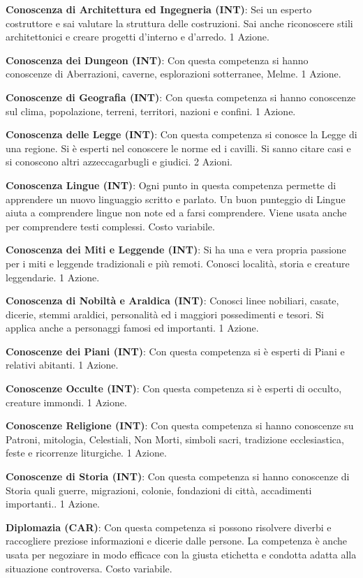 \begin{multicols}{2}
\textbf{Conoscenza di Architettura ed Ingegneria (INT)}: Sei un esperto costruttore e sai valutare la struttura delle costruzioni. Sai anche riconoscere stili architettonici e creare progetti d'interno e d'arredo. 1 Azione.

\textbf{Conoscenza dei Dungeon (INT)}: Con questa competenza si hanno conoscenze di Aberrazioni, caverne, esplorazioni sotterranee, Melme. 1 Azione.

\textbf{Conoscenze di Geografia (INT)}: Con questa competenza si hanno conoscenze sul clima, popolazione, terreni, territori, nazioni e confini. 1 Azione.

\textbf{Conoscenza delle Legge (INT)}: Con questa competenza si conosce la Legge di una regione. Si è esperti nel conoscere le norme ed i cavilli. Si sanno citare casi e si conoscono altri azzeccagarbugli e giudici. 2 Azioni.

\textbf{Conoscenza Lingue (INT)}: Ogni punto in questa competenza permette di apprendere un nuovo linguaggio scritto e parlato. Un buon punteggio di Lingue aiuta a comprendere lingue non note ed a farsi comprendere. Viene usata anche per comprendere testi complessi. Costo variabile.

\textbf{Conoscenza dei Miti e Leggende (INT)}: Si ha una e vera propria passione per i miti e leggende tradizionali e più remoti. Conosci località, storia e creature leggendarie. 1 Azione.

\textbf{Conoscenza di Nobiltà e Araldica (INT)}: Conosci linee nobiliari, casate, dicerie, stemmi araldici, personalità ed i maggiori possedimenti e tesori. Si applica anche a personaggi famosi ed importanti. 1 Azione.

\textbf{Conoscenze dei Piani (INT)}: Con questa competenza si è esperti di Piani e relativi abitanti. 1 Azione.

\textbf{Conoscenze Occulte (INT)}: Con questa competenza si è esperti di occulto, creature immondi. 1 Azione.

\textbf{Conoscenze Religione (INT)}: Con questa competenza si hanno conoscenze su Patroni, mitologia, Celestiali, Non Morti, simboli sacri, tradizione ecclesiastica, feste e ricorrenze liturgiche. 1 Azione.

\textbf{Conoscenze di Storia (INT)}: Con questa competenza si hanno conoscenze di Storia quali guerre, migrazioni, colonie, fondazioni di città, accadimenti importanti.. 1 Azione.

\textbf{Diplomazia (CAR)}: Con questa competenza si possono risolvere diverbi e raccogliere preziose informazioni e dicerie dalle persone. La competenza è anche usata per negoziare in modo efficace con la giusta etichetta e condotta adatta alla situazione controversa. Costo variabile.


\end{multicols}
